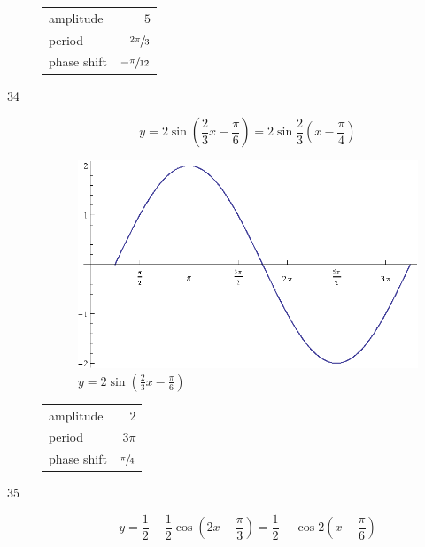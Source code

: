 \documentclass{exam}
\begin{document}
\begin{description}
        \begin{tabular}[H]{lr}
          \toprule
          amplitude   & $5$ \\
          period      & $\sfrac{2 \pi}{3}$ \\
          phase shift & $- \sfrac{\pi}{12}$ \\
          \bottomrule
        \end{tabular}

      \pagebreak

      \item[34]
        \[
          y = 2 \sin \left( \frac{2}{3} x - \frac{\pi}{6} \right) = 2 \sin \frac{2}{3} \left( x - \frac{\pi}{4} \right)
        \]

        \begin{figure}[H]
          \centering
          \includegraphics[scale=1.0]{exercise34.eps}
          \caption{$y = 2 \sin \left( \frac{2}{3} x - \frac{\pi}{6} \right)$}
        \end{figure}

        \begin{tabular}[H]{lr}
          \toprule
          amplitude   & $2$ \\
          period      & $3 \pi$ \\
          phase shift & $\sfrac{\pi}{4}$ \\
          \bottomrule
        \end{tabular}

      \pagebreak

      \item[35]
        \[
          y = \frac{1}{2} - \frac{1}{2} \cos \left( 2x - \frac{\pi}{3} \right) = \frac{1}{2} - \cos 2 \left( x - \frac{\pi}{6} \right)
        \]


\end{description}
\end{document}
